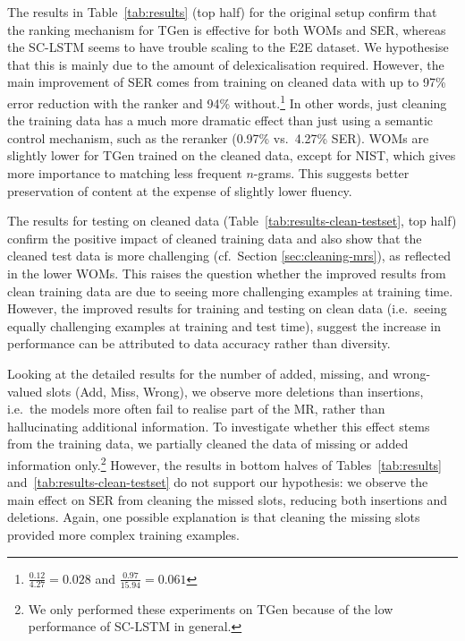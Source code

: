 \documentclass[11pt,a4paper]{article}
\begin{document}
The results in Table~\ref{tab:results} (top half) for the original setup confirm that the ranking mechanism for TGen is effective for both WOMs and SER, whereas the SC-LSTM seems to have trouble scaling to the E2E dataset. 
We hypothesise that this is mainly due to the amount of delexicalisation required.
However, the main improvement of SER comes from training on cleaned data with up to 97\% error reduction with the ranker and  94\% without.\footnote{$\frac{0.12}{4.27} = 0.028$ and $\frac{0.97}{15.94} = 0.061$} 
In other words, just cleaning the training data has a much more dramatic effect than just using a semantic control mechanism, such as the reranker (0.97\% vs.\ 4.27\% SER). 
WOMs are slightly lower for TGen trained on the cleaned data, except for NIST, which gives more importance to matching less frequent $n$-grams. 
This suggests better preservation of content at the expense of slightly lower fluency.

The results for testing on cleaned data (Table~\ref{tab:results-clean-testset}, top half) confirm the positive impact of cleaned training data and also show that the cleaned test data is more challenging (cf.\ Section \ref{sec:cleaning-mrs}), as reflected in the lower WOMs.
This raises the question whether the improved results from clean training data are due to seeing more challenging examples at training time. 
However, the improved results for training and testing on clean data (i.e.\ seeing equally challenging examples at training and test time), suggest the increase in performance can be attributed to data accuracy rather than diversity.

Looking at the detailed results for the number of added, missing, and wrong-valued slots (Add, Miss, Wrong),
we observe more deletions than insertions, i.e.\ the models more often fail to realise part of the MR, rather than hallucinating additional information. To investigate whether this effect stems from the training data, we partially cleaned the data of missing or added information only.\footnote{We only performed these experiments on TGen because of the low performance of SC-LSTM in general.} 
 However, the results in bottom halves of Tables~\ref{tab:results} and~\ref{tab:results-clean-testset} do not support our hypothesis: we observe the main effect on SER from cleaning the missed slots, reducing both insertions and deletions.
 Again, one possible explanation is that cleaning the missing slots provided more complex training examples. 
\end{document}
